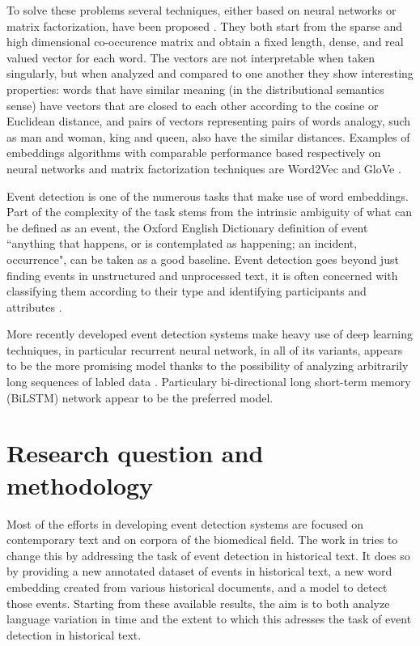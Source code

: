 \documentclass[runningheads]{llncs}
\begin{document}
To solve these problems several techniques, either based on neural networks or matrix factorization, have been proposed \cite{embeddings}. They both start from the sparse and high dimensional co-occurence matrix and obtain a fixed length, dense, and real valued vector for each word. The vectors are not interpretable when taken singularly, but when analyzed and compared to one another they show interesting properties: words that have similar meaning (in the distributional semantics sense) have vectors that are closed to each other according to the cosine or Euclidean distance, and pairs of vectors representing pairs of words analogy, such as man and woman, king and queen, also have the similar distances. Examples of embeddings algorithms with comparable performance based respectively on neural networks and matrix factorization techniques are Word2Vec \cite{wtv} and GloVe \cite{glove}.

Event detection is one of the numerous tasks that make use of word embeddings. Part of the complexity of the task stems from the intrinsic ambiguity of what can be defined as an event, the Oxford English Dictionary definition of event ``anything that happens, or is contemplated as happening; an incident, occurrence", can be taken as a good baseline. Event detection goes beyond just finding events in unstructured and unprocessed text, it is often concerned with classifying them according to their type and identifying participants and attributes \cite{event-survey1}.

More recently developed event detection systems make heavy use of deep learning techniques, in particular recurrent neural network, in all of its variants, appears to be the more promising model thanks to the possibility of analyzing arbitrarily long sequences of labled data \cite{event-survey2}. Particulary bi-directional long short-term memory (BiLSTM) network appear to be the preferred model.

\section{Research question and methodology}

Most of the efforts in developing event detection systems are focused on contemporary text and on corpora of the biomedical field. The work in \cite{histo} tries to change this by addressing the task of event detection in historical text. It does so by providing a new annotated dataset of events in historical text, a new word embedding created from various historical documents, and a model to detect those events. Starting from these available results, the aim is to both analyze language variation in time and the extent to which this adresses the task of event detection in historical text.
\end{document}
